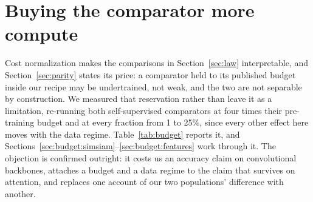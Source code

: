 \section{Buying the comparator more compute}\label{sec:budget}

Cost normalization makes the comparisons in Section~\ref{sec:law}
interpretable, and Section~\ref{sec:parity} states its price: a comparator
held to its published budget inside our recipe may be undertrained, not weak, and the two are not separable by construction. We measured that
reservation rather than leave it as a limitation, re-running both
self-supervised comparators at four times their pre-training budget and at
every fraction from 1 to 25\%, since every other effect here moves with the
data regime. Table~\ref{tab:budget} reports it, and
Sections~\ref{sec:budget:simsiam}--\ref{sec:budget:features} work through it.
The objection is confirmed outright: it costs us an accuracy claim on
convolutional backbones, attaches a budget and a data regime to the claim that
survives on attention, and replaces one account of our two populations'
difference with another.

